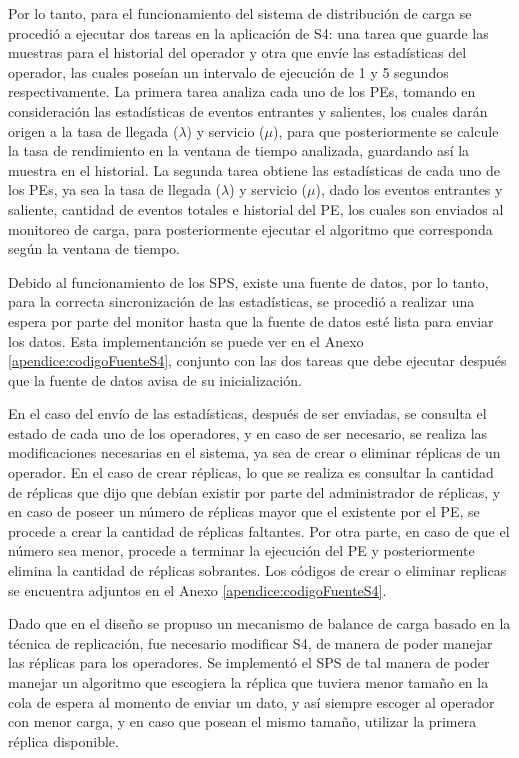 Por lo tanto, para el funcionamiento del sistema de distribución de carga se procedió a ejecutar dos tareas en la aplicación de S4: una tarea que guarde las muestras para el historial del operador y otra que envíe las estadísticas del operador, las cuales poseían un intervalo de ejecución de 1 y 5 segundos respectivamente. La primera tarea analiza cada uno de los PEs, tomando en consideración las estadísticas de eventos entrantes y salientes, los cuales darán origen a la tasa de llegada ($\lambda$) y servicio ($\mu$), para que posteriormente se calcule la tasa de rendimiento en la ventana de tiempo analizada, guardando así la muestra en el historial. La segunda tarea obtiene las estadísticas de cada uno de los PEs, ya sea la tasa de llegada ($\lambda$) y servicio ($\mu$), dado los eventos entrantes y saliente, cantidad de eventos totales e historial del PE, los cuales son enviados al monitoreo de carga, para posteriormente ejecutar el algoritmo que corresponda según la ventana de tiempo.

Debido al funcionamiento de los SPS, existe una fuente de datos, por lo tanto, para la correcta sincronización de las estadísticas, se procedió a realizar una espera por parte del monitor hasta que la fuente de datos esté lista para enviar los datos. Esta implementanción se puede ver en el Anexo \ref{apendice:codigoFuenteS4}, conjunto con las dos tareas que debe ejecutar después que la fuente de datos avisa de su inicialización.

En el caso del envío de las estadísticas, después de ser enviadas, se consulta el estado de cada uno de los operadores, y en caso de ser necesario, se realiza las modificaciones necesarias en el sistema, ya sea de crear o eliminar réplicas de un operador. En el caso de crear réplicas, lo que se realiza es consultar la cantidad de réplicas que dijo que debían existir por parte del administrador de réplicas, y en caso de poseer un número de réplicas mayor que el existente por el PE, se procede a crear la cantidad de réplicas faltantes. Por otra parte, en caso de que el número sea menor, procede a terminar la ejecución del PE y posteriormente elimina la cantidad de réplicas sobrantes. Los códigos de crear o eliminar replicas se encuentra adjuntos en el Anexo \ref{apendice:codigoFuenteS4}.

Dado que en el diseño se propuso un mecanismo de balance de carga basado en la técnica de replicación, fue necesario modificar S4, de manera de poder manejar las réplicas para los operadores. Se implementó el SPS de tal manera de poder manejar un algoritmo que escogiera la réplica que tuviera menor tamaño en la cola de espera al momento de enviar un dato, y así siempre escoger al operador con menor carga, y en caso que posean el mismo tamaño, utilizar la primera réplica disponible.

